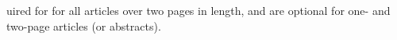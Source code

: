 uired for for all
articles over two pages in length, and are optional for one- and
two-page articles (or abstracts).